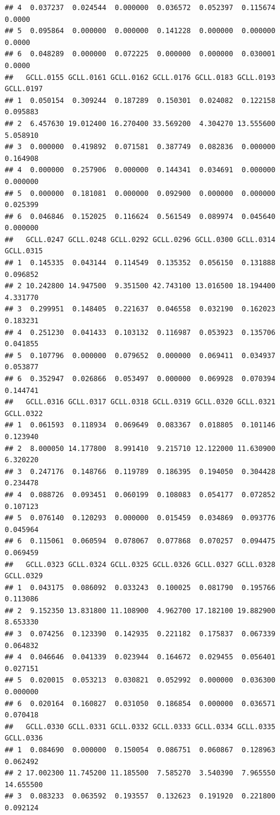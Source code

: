 \documentclass[
]{article}
\begin{document}
\begin{verbatim}
## 4  0.037237  0.024544  0.000000  0.036572  0.052397  0.115674    0.0000
## 5  0.095864  0.000000  0.000000  0.141228  0.000000  0.000000    0.0000
## 6  0.048289  0.000000  0.072225  0.000000  0.000000  0.030001    0.0000
##   GCLL.0155 GCLL.0161 GCLL.0162 GCLL.0176 GCLL.0183 GCLL.0193 GCLL.0197
## 1  0.050154  0.309244  0.187289  0.150301  0.024082  0.122158  0.095883
## 2  6.457630 19.012400 16.270400 33.569200  4.304270 13.555600  5.058910
## 3  0.000000  0.419892  0.071581  0.387749  0.082836  0.000000  0.164908
## 4  0.000000  0.257906  0.000000  0.144341  0.034691  0.000000  0.000000
## 5  0.000000  0.181081  0.000000  0.092900  0.000000  0.000000  0.025399
## 6  0.046846  0.152025  0.116624  0.561549  0.089974  0.045640  0.000000
##   GCLL.0247 GCLL.0248 GCLL.0292 GCLL.0296 GCLL.0300 GCLL.0314 GCLL.0315
## 1  0.145335  0.043144  0.114549  0.135352  0.056150  0.131888  0.096852
## 2 10.242800 14.947500  9.351500 42.743100 13.016500 18.194400  4.331770
## 3  0.299951  0.148405  0.221637  0.046558  0.032190  0.162023  0.183231
## 4  0.251230  0.041433  0.103132  0.116987  0.053923  0.135706  0.041855
## 5  0.107796  0.000000  0.079652  0.000000  0.069411  0.034937  0.053877
## 6  0.352947  0.026866  0.053497  0.000000  0.069928  0.070394  0.144741
##   GCLL.0316 GCLL.0317 GCLL.0318 GCLL.0319 GCLL.0320 GCLL.0321 GCLL.0322
## 1  0.061593  0.118934  0.069649  0.083367  0.018805  0.101146  0.123940
## 2  8.000050 14.177800  8.991410  9.215710 12.122000 11.630900  6.320220
## 3  0.247176  0.148766  0.119789  0.186395  0.194050  0.304428  0.234478
## 4  0.088726  0.093451  0.060199  0.108083  0.054177  0.072852  0.107123
## 5  0.076140  0.120293  0.000000  0.015459  0.034869  0.093776  0.045964
## 6  0.115061  0.060594  0.078067  0.077868  0.070257  0.094475  0.069459
##   GCLL.0323 GCLL.0324 GCLL.0325 GCLL.0326 GCLL.0327 GCLL.0328 GCLL.0329
## 1  0.043175  0.086092  0.033243  0.100025  0.081790  0.195766  0.113086
## 2  9.152350 13.831800 11.108900  4.962700 17.182100 19.882900  8.653330
## 3  0.074256  0.123390  0.142935  0.221182  0.175837  0.067339  0.064832
## 4  0.046646  0.041339  0.023944  0.164672  0.029455  0.056401  0.027151
## 5  0.020015  0.053213  0.030821  0.052992  0.000000  0.036300  0.000000
## 6  0.020164  0.160827  0.031050  0.186854  0.000000  0.036571  0.070418
##   GCLL.0330 GCLL.0331 GCLL.0332 GCLL.0333 GCLL.0334 GCLL.0335 GCLL.0336
## 1  0.084690  0.000000  0.150054  0.086751  0.060867  0.128963  0.062492
## 2 17.002300 11.745200 11.185500  7.585270  3.540390  7.965550 14.655500
## 3  0.083233  0.063592  0.193557  0.132623  0.191920  0.221800  0.092124

\end{verbatim}
\end{document}
